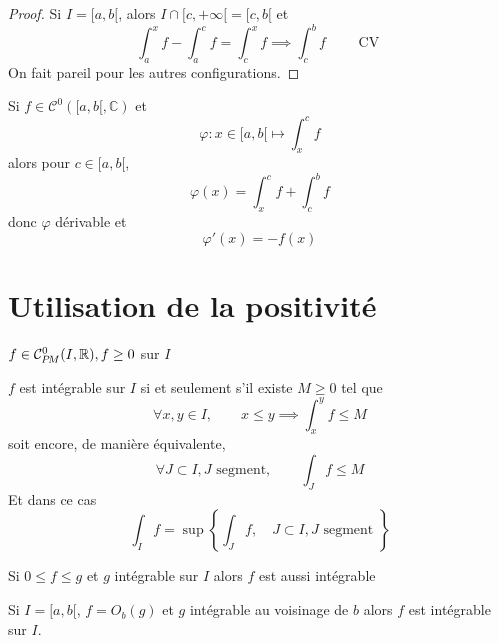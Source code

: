 \begin{proof}
    Si $I=[a, b[$, alors $I\cap [c, +\infty[=[c, b[$ et \[
        \int_a^xf-\int_a^cf=\int_c^xf\implies \int_c^bf\qquad \text{ CV }
    \]
    On fait pareil pour les autres configurations.
\end{proof}

\begin{rem}
    Si $f\in \mathcal C^0([a, b[, \mathbb C)$ et \[
        \varphi: x\in [a, b[\longmapsto \int_x^cf
    \]
    alors pour $c\in [a, b[$, \[
        \varphi(x)=\int_x^cf+\int_c^bf
    \]
    donc $\varphi$ dérivable et \[
        \varphi'(x)=-f(x)
    \]
\end{rem}

\section{Utilisation de la positivité}

\begin{prop}
    \Hyp $f\in\CPM(I, \mathbb R), f\geq 0$ sur $I$
    \begin{concenum}
    \item $f$ est intégrable sur $I$ si et seulement s'il existe $M\geq 0$ tel que \[
            \forall x, y\in I, \qquad x\leq y\implies \int_x^yf\leq M
        \]
        soit encore, de manière équivalente, \[
            \forall J\subset I, J\text{ segment},\qquad  \int_Jf\leq M
        \]
        Et dans ce cas \[
            \int_If=\sup \left\{ \int_Jf,\quad J\subset I, J\text{ segment } \right\}
        \]
    \item Si $0\leq f\leq g$ et $g$ intégrable sur $I$ alors $f$ est aussi intégrable
    \item Si $I=[a, b[$, $f=O_b(g)$ et $g$ intégrable au voisinage de $b$ alors $f$ est intégrable sur $I$.
    \end{concenum}
\end{prop}

